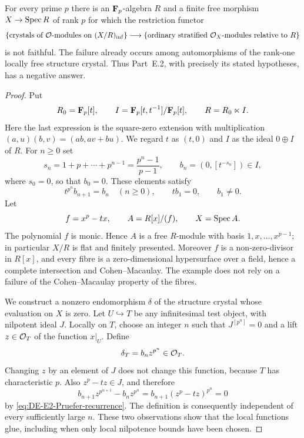 \begin{theorem}\label{thm:DE-E2-counterexample}
For every prime $p$ there is an $\mathbf F_p$-algebra $R$ and a finite free morphism $X\to\operatorname{Spec} R$ of rank $p$ for which the restriction functor
\[
 \{\text{crystals of $\mathcal O$-modules on $(X/R)_{\rm inf}$}\}
 \longrightarrow
 \{\text{ordinary stratified $\mathcal O_X$-modules relative to $R$}\}
\]
is not faithful.  The failure already occurs among automorphisms of the rank-one locally free structure crystal.  Thus Part~E.2, with precisely its stated hypotheses, has a negative answer.
\end{theorem}
\begin{proof}
Put
\[
 R_0=\mathbf F_p[t],\qquad I=\mathbf F_p[t,t^{-1}]/\mathbf F_p[t],\qquad
 R=R_0\ltimes I.
\]
Here the last expression is the square-zero extension with multiplication
$(a,u)(b,v)=(ab,av+bu)$.  We regard $t$ as $(t,0)$ and $I$ as the ideal $0\oplus I$ of $R$.  For $n\geq0$ set
\[
 s_n=1+p+\cdots+p^{n-1}=\frac{p^n-1}{p-1},\qquad
 b_n=(0,[t^{-s_n}])\in I,
\]
where $s_0=0$, so that $b_0=0$.  These elements satisfy
\begin{equation}\label{eq:DE-E2-Pruefer-recurrence}
 t^{p^n}b_{n+1}=b_n\quad(n\geq0),\qquad
 tb_1=0,\qquad b_1\ne0.
\end{equation}
Let
\[
 f=x^p-tx,\qquad A=R[x]/(f),\qquad X=\operatorname{Spec} A.
\]
The polynomial $f$ is monic.  Hence $A$ is a free $R$-module with basis $1,x,\ldots,x^{p-1}$; in particular $X/R$ is flat and finitely presented.  Moreover $f$ is a non-zero-divisor in $R[x]$, and every fibre is a zero-dimensional hypersurface over a field, hence a complete intersection and Cohen--Macaulay.  The example does not rely on a failure of the Cohen--Macaulay property of the fibres.

We construct a nonzero endomorphism $\delta$ of the structure crystal whose evaluation on $X$ is zero.  Let $U\hookrightarrow T$ be any infinitesimal test object, with nilpotent ideal $J$.  Locally on $T$, choose an integer $n$ such that $J^{[p^n]}=0$ and a lift $z\in\mathcal O_T$ of the function $x|_U$.  Define
\begin{equation}\label{eq:DE-E2-phantom-value}
                     \delta_T=b_nz^{p^n}\in\mathcal O_T.
\end{equation}
Changing $z$ by an element of $J$ does not change this function, because $T$ has characteristic $p$.  Also $z^p-tz\in J$, and therefore
\[
 b_{n+1}z^{p^{n+1}}-b_nz^{p^n}
       =b_{n+1}(z^p-tz)^{p^n}=0
\]
by \eqref{eq:DE-E2-Pruefer-recurrence}.  The definition is consequently independent of every sufficiently large $n$.  These two observations show that the local functions glue, including when only local nilpotence bounds have been chosen.


\end{proof}
